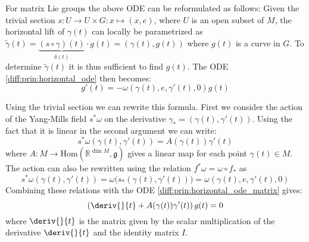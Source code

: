 	\begin{example}
		 For matrix Lie groups the above ODE can be reformulated as follows: Given the trivial section $s:U\rightarrow U\times G:x\mapsto (x, e)$, where $U$ is an open subset of $M$, the horizontal lift of $\gamma(t)$ can locally be parametrized as $\widetilde{\gamma}(t) = \underbrace{(s\circ\gamma)(t)}_{\delta(t)}\cdot g(t) = (\gamma(t), g(t))$ where $g(t)$ is a curve in $G$. To determine $\widetilde{\gamma}(t)$ it is thus sufficient to find $g(t)$. The ODE \ref{diff:prin:horizontal_ode} then becomes:
		\begin{equation}
			\label{diff:prin:horizontal_ode_matrix}
			g'(t) = -\omega(\gamma(t), e, \gamma'(t), 0)g(t)
		\end{equation}
		
		Using the trivial section we can rewrite this formula. First we consider the action of the Yang-Mills field $s^*\omega$ on the derivative $\gamma_* = (\gamma(t), \gamma'(t))$. Using the fact that it is linear in the second argument we can write: \[s^*\omega(\gamma(t), \gamma'(t)) = A(\gamma(t))\gamma'(t)\] where $A:M\rightarrow\text{Hom}(\mathbb{R}^{\dim M}, \mathfrak{g})$ gives a linear map for each point $\gamma(t)\in M$. The action can also be rewritten using the relation $f^*\omega = \omega\circ f_\ast$ as\[s^*\omega(\gamma(t), \gamma'(t)) = \omega\Big(s_\ast(\gamma(t), \gamma'(t))\Big) = \omega(\gamma(t), e, \gamma'(t), 0)\]
		Combining these relations with the ODE \ref{diff:prin:horizontal_ode_matrix} gives:
		\begin{equation}
			\label{diff:prin:horizontal_ode_derivative}
			\left(\deriv{}{t} + A(\gamma(t))\gamma'(t)\right)g(t) = 0
		\end{equation}
		where $\deriv{}{t}$ is the matrix given by the scalar multiplication of the derivative $\deriv{}{t}$ and the identity matrix $I$.
	\end{example}
	
